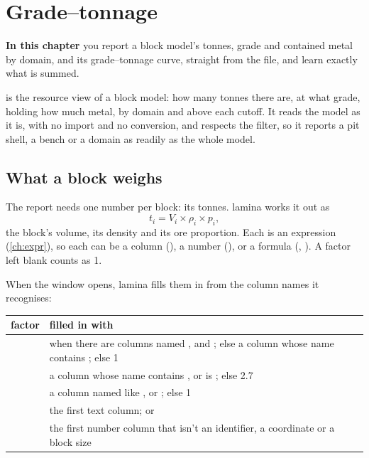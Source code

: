 \chapter{Grade–tonnage}\label{ch:gt}
\begin{goals}
\textbf{In this chapter} you report a block model's tonnes, grade and contained metal by domain, and its
grade–tonnage curve, straight from the file, and learn exactly what is summed.
\end{goals}

 is the resource view of a block model: how many tonnes there are, at what
grade, holding how much metal, by domain and above each cutoff. It reads the model as it is, with no
import and no conversion, and respects the filter, so it reports a pit shell, a bench or a domain as
readily as the whole model.

\section{What a block weighs}\label{sec:gt-weight}

The report needs one number per block: its tonnes. lamina works it out as
\[
t_i = V_i \times \rho_i \times p_i ,
\]
the block's volume, its density and its ore proportion. Each is an expression (\cref{ch:expr}), so each can
be a column (), a number (), or a formula (,
). A factor left blank counts as 1.

When the window opens, lamina fills them in from the column names it recognises:

\begin{center}\small
\begin{tabularx}{\linewidth}{@{}lL@{}}
\toprule
\sffamily\bfseries factor & \sffamily\bfseries filled in with \\
\midrule
{} &  when there are columns named ,  and ; else a
column whose name contains ; else 1 \\
 & a column whose name contains , or is ; else 2.7 \\
 & a column named like ,  or ; else 1 \\
 & the first text column; or  \\
 & the first number column that isn't an identifier, a coordinate or a block size \\
\bottomrule
\end{tabularx}
\end{center}

